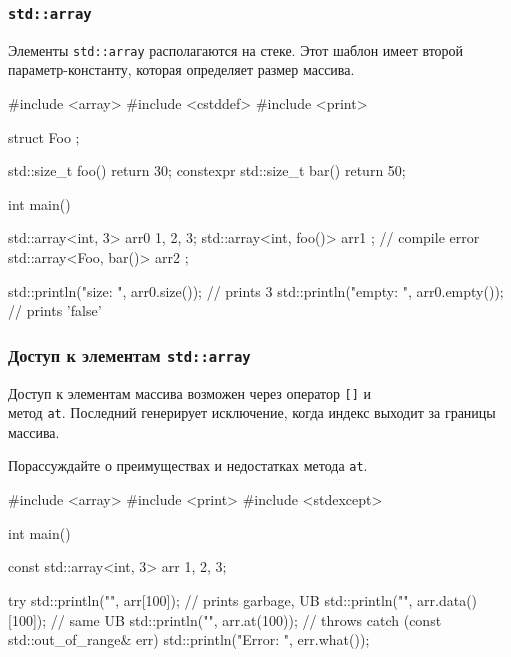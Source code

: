 \documentclass[compress, 8pt]{beamer}
\begin{document}
  \begin{frame}[fragile]

    \frametitle{\texttt{std::array}}

    Элементы \texttt{std::array}\footnotemark{} располагаются на стеке.
    Этот шаблон имеет второй параметр-константу, которая определяет размер
    массива.


    \begin{myinplacelisting}[minted language=cpp]
#include <array>
#include <cstddef>
#include <print>

struct Foo {};

std::size_t foo() { return 30; }
constexpr std::size_t bar() { return 50; }

int main() {
    std::array<int, 3> arr0 {1, 2, 3};
    std::array<int, foo()> arr1 {}; // compile error
    std::array<Foo, bar()> arr2 {};

    std::println("size: {}", arr0.size()); // prints 3
    std::println("empty: {}", arr0.empty()); // prints 'false'
}
    \end{myinplacelisting}

  \end{frame}

  \begin{frame}[fragile]

    \frametitle{Доступ к элементам \texttt{std::array}}

    Доступ к элементам массива возможен через оператор \verb|[]|
    и \\ метод \texttt{at}.
    Последний генерирует исключение, когда индекс выходит
    за границы массива.

    \begin{task}
      Порассуждайте о преимуществах и недостатках метода \texttt{at}.
    \end{task}

    \begin{myinplacelisting}[minted language=cpp]
#include <array>
#include <print>
#include <stdexcept>

int main() {
    const std::array<int, 3> arr {1, 2, 3};

    try {
        std::println("{}", arr[100]); // prints garbage, UB
        std::println("{}", arr.data()[100]); // same UB
        std::println("{}", arr.at(100)); // throws
    }
    catch (const std::out_of_range& err) {
        std::println("Error: {}", err.what());
    }
}
    \end{myinplacelisting}

  \end{frame}
\end{document}
